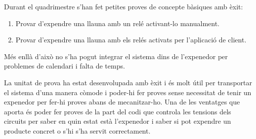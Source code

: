 Durant el quadrimestre s'han fet petites proves de concepte bàsiques amb èxit:
\begin{enumerate}
\vspace{-1em}
\item Provar d'expendre una llauna amb un relé activant-lo manualment.
\item Provar d'expendre una llauna amb els relés activats per l'aplicació de client.
\vspace{-1em}
\end{enumerate}

Més enllà d'això no s'ha pogut integrar el sistema dins de l'expenedor per problemes de calendari i falta de temps.

La unitat de prova ha estat desenvolupada amb èxit i és molt útil per transportar el sistema d'una manera còmode i poder-hi fer proves sense necessitat de tenir un expenedor per fer-hi proves abans de mecanitzar-ho. Una de les ventatges que aporta és poder fer proves de la part del codi que controla les tensions dels circuits per saber en quin estat està l'expenedor i saber si pot expendre un producte concret o s'hi s'ha servit correctament.

